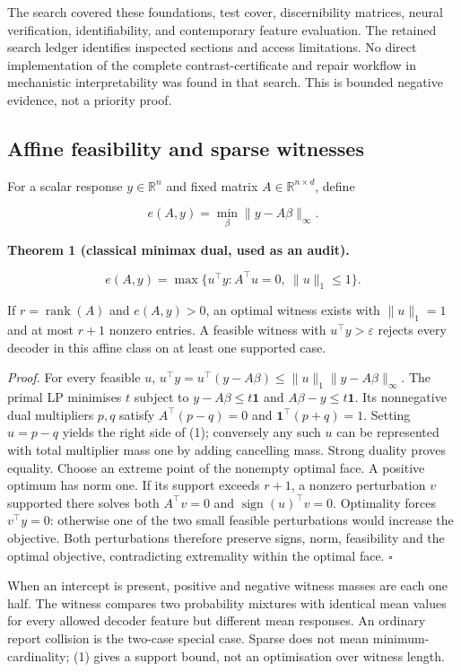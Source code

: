 \documentclass[
  british,
  11pt,
  a4paper,
]{article}
\newcounter{none} %
\begin{document}
The search covered these foundations, test cover, discernibility
matrices, neural verification, identifiability, and contemporary feature
evaluation. The retained search ledger identifies inspected sections and
access limitations. No direct implementation of the complete
contrast-certificate and repair workflow in mechanistic interpretability
was found in that search. This is bounded negative evidence, not a
priority proof.

\subsection{Affine feasibility and sparse
witnesses}\label{affine-feasibility-and-sparse-witnesses}

For a scalar response \(y\in\mathbb R^n\) and fixed matrix
\(A\in\mathbb R^{n\times d}\), define

\[ e(A,y)=\min_\beta\|y-A\beta\|_\infty. \]

\textbf{Theorem 1 (classical minimax dual, used as an audit).}

\[
e(A,y)=\max\{u^\top y:A^\top u=0,\ \|u\|_1\le1\}.
\tag{1}
\]

If \(r=\operatorname{rank}(A)\) and \(e(A,y)>0\), an optimal witness
exists with \(\|u\|_1=1\) and at most \(r+1\) nonzero entries. A
feasible witness with \(u^\top y>\varepsilon\) rejects every decoder in
this affine class on at least one supported case.

\emph{Proof.} For every feasible \(u\),
\(u^\top y=u^\top(y-A\beta)\le\|u\|_1\|y-A\beta\|_\infty\). The primal
LP minimises \(t\) subject to \(y-A\beta\le t\mathbf1\) and
\(A\beta-y\le t\mathbf1\). Its nonnegative dual multipliers \(p,q\)
satisfy \(A^\top(p-q)=0\) and \(\mathbf1^\top(p+q)=1\). Setting
\(u=p-q\) yields the right side of (1); conversely any such \(u\) can be
represented with total multiplier mass one by adding cancelling mass.
Strong duality proves equality. Choose an extreme point of the nonempty
optimal face. A positive optimum has norm one. If its support exceeds
\(r+1\), a nonzero perturbation \(v\) supported there solves both
\(A^\top v=0\) and \(\operatorname{sign}(u)^\top v=0\). Optimality
forces \(v^\top y=0\): otherwise one of the two small feasible
perturbations would increase the objective. Both perturbations therefore
preserve signs, norm, feasibility and the optimal objective,
contradicting extremality within the optimal face. \(\square\)

When an intercept is present, positive and negative witness masses are
each one half. The witness compares two probability mixtures with
identical mean values for every allowed decoder feature but different
mean responses. An ordinary report collision is the two-case special
case. Sparse does not mean minimum-cardinality; (1) gives a support
bound, not an optimisation over witness length.
\end{document}
